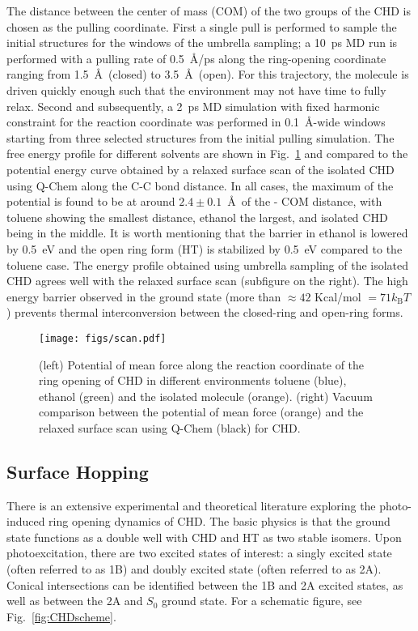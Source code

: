 \documentclass[journal=jctcce,manuscript=article,layout=traditional]{achemso}
\newcommand{\fig}[1]{Fig.~\ref{#1}}
\begin{document}
The distance between the center of mass (COM) of the two  groups of the CHD is chosen as the pulling coordinate. First a single  pull is performed to sample the initial structures for the windows of the umbrella sampling; a 10~ps MD run is performed with a pulling rate of 0.5~\AA/ps along the ring-opening coordinate ranging from 1.5~\AA\ (closed) to 3.5~\AA\ (open).   For this trajectory, the molecule is driven quickly enough such that the environment may not have time to fully relax. Second and subsequently, a 2~ps MD simulation with fixed harmonic constraint for the reaction coordinate was performed in 0.1~\AA-wide windows starting from three selected structures from the initial pulling simulation. The free energy profile for different solvents are shown in \fig{fig:umbrella} and compared to the potential energy curve obtained by a relaxed surface scan of the isolated CHD using Q-Chem along the C-C bond distance. In all cases, the maximum of the potential is found to be at around $2.4\pm0.1$~\AA\ of the - COM distance, with toluene showing the smallest distance, ethanol the largest, and isolated CHD being in the middle. It is worth mentioning that the barrier in ethanol is lowered by 0.5~eV and the open ring form (HT) is stabilized by 0.5~eV compared to the toluene case. The energy profile obtained using umbrella sampling of the isolated CHD agrees well with the relaxed surface scan (subfigure on the right). The high energy barrier observed in the ground state (more than $\approx42$ Kcal/mol $=71 k_{\textrm{B}} T$) prevents thermal interconversion between the closed-ring and open-ring forms.


%
%
%
%
%

%
%
%
%
%
%
%
%
%
%
%

\begin{figure}
    \centering
        \texttt{[image: figs/scan.pdf]}
    \caption{(left) Potential of mean force along the reaction coordinate of the ring opening of CHD in different environments toluene (blue), ethanol (green) and the isolated molecule (orange). (right) Vacuum comparison between the potential of mean force (orange) and the relaxed surface scan using Q-Chem (black) for CHD. %
    }
    \label{fig:umbrella}
\end{figure}

\subsection{Surface Hopping}\label{sec:FSSH}
There is an extensive experimental\cite{weber2006:CHD} and theoretical\cite{tamura2006:CHDdynamics} literature\cite{deb2011:CHDReview} exploring the  photo-induced ring opening dynamics of CHD. The basic physics is that the ground state functions as a double well with CHD and HT as two stable isomers. Upon photoexcitation, there are two excited states of interest: a singly excited state (often referred to as 1B) and doubly excited state (often referred to as 2A). Conical intersections can be identified between the 1B and 2A excited states, as well as between the 2A and $S_0$ ground state. For a schematic figure, see \fig{fig:CHDscheme}.
\end{document}
